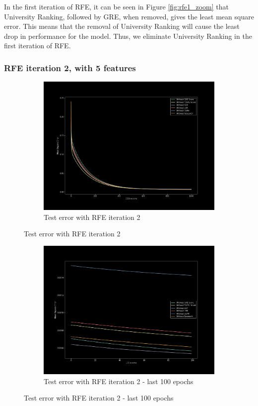 In the first iteration of RFE, it can be seen in Figure \ref{fig:rfe1_zoom} that University Ranking, followed by GRE, when removed, gives the least mean square error. This means that the removal of University Ranking will cause the least drop in performance for the model. Thus, we eliminate University Ranking in the first iteration of RFE.

\subsubsection{RFE iteration 2, with 5 features}
\begin{figure}[H]
    \begin{subfigure}{1\textwidth}
        \centering
        \includegraphics[width=0.8\linewidth]{assets/plots2/part3_5.png}
        \caption{Test error with RFE iteration 2}
        \label{fig:rfe2}
    \end{subfigure}
\end{figure}
\begin{figure}[H]
    \ContinuedFloat
    \begin{subfigure}{1\textwidth}
        \centering
        \includegraphics[width=0.8\linewidth]{assets/plots2/part3_6.png}
        \caption{Test error with RFE iteration 2 - last 100 epochs}
        \label{fig:rfe2_zoom}
    \end{subfigure}
\end{figure}


